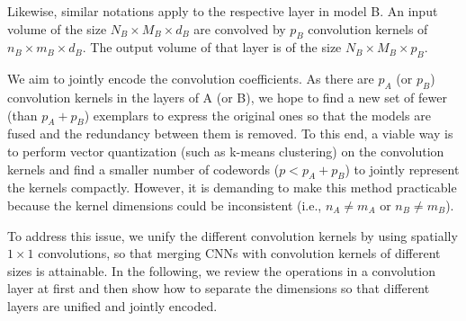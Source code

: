 \documentclass{article}
\begin{document}
	Likewise, similar notations apply to the respective layer in model B.
	An input volume of the size $N_B \times M_B \times d_B$ are convolved by $p_B$ convolution kernels of $n_B \times m_B \times d_B$.
	The output volume of that layer is of the size $N_B \times M_B \times p_B$.
	
	We aim to jointly encode the convolution coefficients.
	As there are $p_A$ (or $p_B$) convolution kernels in the layers of A (or B), we hope to find a new set of fewer (than $p_A+p_B$) exemplars to express the original ones so that the models are fused and the redundancy between them is removed.
	To this end, a viable way is to perform vector quantization (such as k-means clustering) on the convolution kernels and find a smaller number of codewords ($p<p_A+p_B$) to jointly represent the kernels compactly.
	However, it is demanding to make this method practicable because the kernel dimensions could be inconsistent (i.e., $n_A \neq m_A$ or $n_B \neq m_B$).
	
	To address this issue, we unify the different convolution kernels by using spatially  $1\times 1$ convolutions,
	so that merging CNNs with convolution kernels of different sizes is attainable.
	In the following, we review the operations in a convolution layer at first and then show how to separate the dimensions so that different layers are unified and jointly encoded.
	
	
\end{document}
